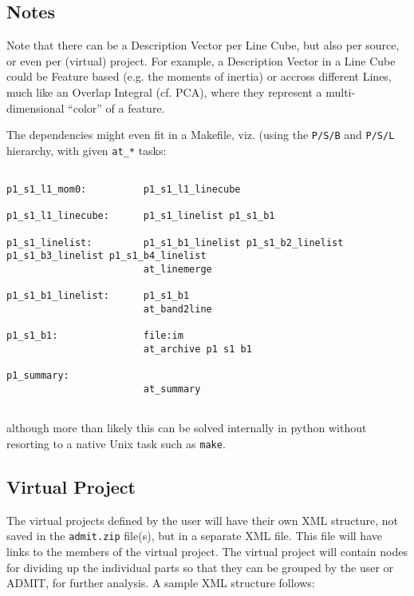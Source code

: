 \documentclass{article}
\begin{document}
\subsection{Notes}
Note that there can be a Description Vector per Line Cube, but also per source, or even per (virtual) 
project. For example, a Description Vector in a Line Cube could be Feature based (e.g. the moments of inertia)
or accross different Lines, much like an Overlap Integral (cf. PCA), where they represent a 
multi-dimensional ``color'' of a feature.


\newpage





The dependencies might even fit in a Makefile, viz. (using the {\tt P/S/B} and {\tt P/S/L} hierarchy, with
given {\tt at\_*} tasks:


\footnotesize
\begin{verbatim}

p1_s1_l1_mom0:          p1_s1_l1_linecube

p1_s1_l1_linecube:      p1_s1_linelist p1_s1_b1

p1_s1_linelist:         p1_s1_b1_linelist p1_s1_b2_linelist p1_s1_b3_linelist p1_s1_b4_linelist
                        at_linemerge

p1_s1_b1_linelist:      p1_s1_b1
                        at_band2line

p1_s1_b1:               file:im
                        at_archive p1 s1 b1

p1_summary:
                        at_summary
        
\end{verbatim}
\normalsize

\noindent
although more than likely this can be solved internally in python without resorting to
a native Unix task such as {\tt make}.

\subsection{Virtual Project}

The virtual projects defined by the user will have their own XML
structure, not saved in the {\tt admit.zip} file(s), but in a separate XML
file. This file will have links to the members of the virtual project. The
virtual project will contain nodes for dividing up the individual
parts so that they can be grouped by the user or ADMIT, for further
analysis. A sample XML structure follows:
\end{document}
